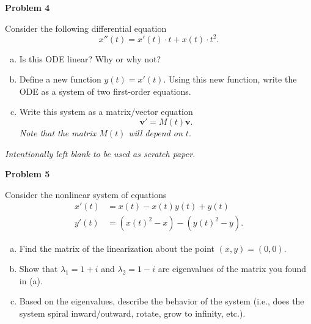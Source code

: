 \documentclass[12pt]{amsbook}
\begin{document}
\newpage

\textbf{Problem 4} 

\vspace{.25cm}

Consider the following differential equation
\[
x''(t) = x'(t)\cdot t+x(t) \cdot t^2.
\]
\vspace*{.5cm}
\begin{enumerate}[(a)]
    \item Is this ODE linear? Why or why not?
    \vspace*{3cm}
    \item Define a new function $y(t)=x'(t)$. Using this new function, write the ODE as a system of two first-order equations.
    \vspace*{5cm}
    \item Write this system as a matrix/vector equation
    \[
    \mathbf{v}'=M(t)\mathbf{v}.
    \]
    \emph{Note that the matrix $M(t)$ will depend on $t$}.
\end{enumerate}





\newpage
\emph{Intentionally left blank to be used as scratch paper.}\\















\newpage

\textbf{Problem 5} 

\vspace{.25cm}

Consider the nonlinear system of equations
\begin{align*}
    x'(t) &= x(t)-x(t)y(t)+y(t)\\
    y'(t) &= (x(t)^2-x)-(y(t)^2-y).
\end{align*}

\begin{enumerate}[(a)]
    \item Find the matrix of the linearization about the point $(x,y)=(0,0)$.
    \vspace*{6cm}
    \item Show that $\lambda_1=1+i$ and $\lambda_2=1-i$ are eigenvalues of the matrix you found in (a).
    \vspace*{6cm}
    \item Based on the eigenvalues, describe the behavior of the system (i.e., does the system spiral inward/outward, rotate, grow to infinity, etc.).
\end{enumerate}
\end{document}
